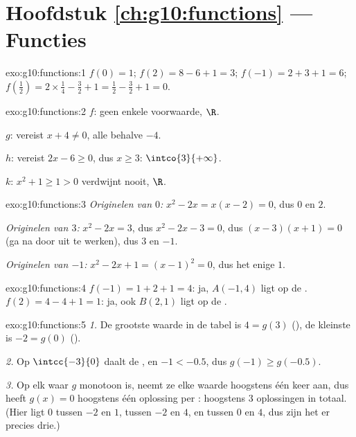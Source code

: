 \section*{Hoofdstuk \ref{ch:g10:functions} --- Functies}

\begin{solution}{exo:g10:functions:1}
$f(0) = 1$; \quad $f(2) = 8 - 6 + 1 = 3$; \quad
$f(-1) = 2 + 3 + 1 = 6$; \quad
$f\!\left(\tfrac12\right) = 2 \times \tfrac14 - \tfrac32 + 1 = \tfrac12 -
\tfrac32 + 1 = 0$.
\end{solution}

\begin{solution}{exo:g10:functions:2}
$f$: geen enkele voorwaarde,  $\R$.

$g$: vereist $x + 4 \neq 0$,  alle  behalve $-4$.

$h$: vereist $2x - 6 \geq 0$, dus $x \geq 3$:  $\intco{3}{+\infty}$.

$k$: $x^2 + 1 \geq 1 > 0$ verdwijnt nooit,  $\R$.
\end{solution}

\begin{solution}{exo:g10:functions:3}
\emph{Originelen van $0$:} $x^2 - 2x = x(x-2) = 0$, dus $0$ en $2$.

\emph{Originelen van $3$:} $x^2 - 2x = 3$, dus $x^2 - 2x - 3 = 0$, dus
$(x-3)(x+1) = 0$ (ga na door uit te werken), dus $3$ en $-1$.

\emph{Originelen van $-1$:} $x^2 - 2x + 1 = (x - 1)^2 = 0$, dus het enige
 $1$.
\end{solution}

\begin{solution}{exo:g10:functions:4}
$f(-1) = 1 + 2 + 1 = 4$: ja, $A(-1, 4)$ ligt op de .
$f(2) = 4 - 4 + 1 = 1$: ja, ook $B(2, 1)$ ligt op de .
\end{solution}

\begin{solution}{exo:g10:functions:5}
\emph{1.} De grootste waarde in de tabel is $4 = g(3)$ (), de
kleinste is $-2 = g(0)$ ().

\emph{2.} Op $\intcc{-3}{0}$ daalt de , en $-1 < -0.5$, dus
$g(-1) \geq g(-0.5)$.

\emph{3.} Op elk  waar $g$ monotoon is, neemt ze elke waarde
hoogstens één keer aan, dus heeft $g(x) = 0$ hoogstens één oplossing per
: hoogstens $3$ oplossingen in totaal. (Hier ligt $0$ tussen $-2$ en
$1$, tussen $-2$ en $4$, en tussen $0$ en $4$, dus zijn het er precies
drie.)
\end{solution}


